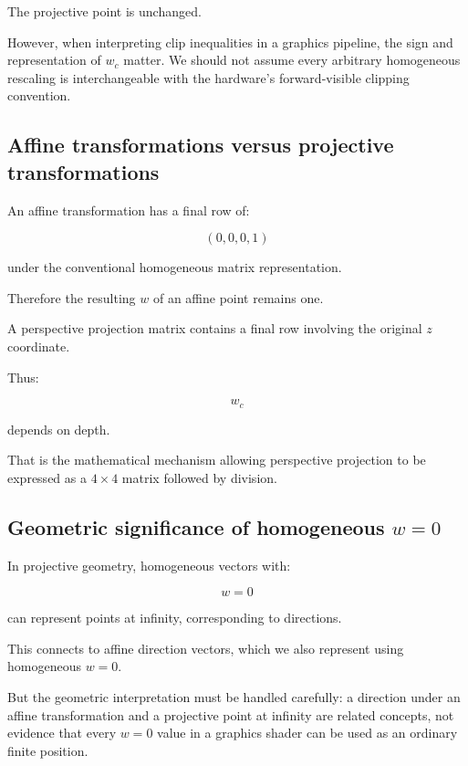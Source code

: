 The projective point is unchanged.

However, when interpreting clip inequalities in a graphics pipeline, the sign and representation of \(w_c\) matter. We should not assume every arbitrary homogeneous rescaling is interchangeable with the hardware's forward-visible clipping convention.

\subsection{Affine transformations versus projective transformations}\label{02-foundations-ii-ch033-affine-transformations-versus-projective-transformations}

\hypertarget{02-foundations-ii-ch033-affine-transformations-versus-projective-transformations}{}

An affine transformation has a final row of:

\[
 (0,0,0,1)
\]

under the conventional homogeneous matrix representation.

Therefore the resulting \(w\) of an affine point remains one.

A perspective projection matrix contains a final row involving the original \(z\) coordinate.

Thus:

\[
 w_c
\]

depends on depth.

That is the mathematical mechanism allowing perspective projection to be expressed as a \(4\times4\) matrix followed by division.

\subsection{\texorpdfstring{Geometric significance of homogeneous \(w=0\)}{Geometric significance of homogeneous w=0}}\label{02-foundations-ii-ch033-geometric-significance-of-homogeneous-w0}

\hypertarget{02-foundations-ii-ch033-geometric-significance-of-homogeneous-w0}{}

In projective geometry, homogeneous vectors with:

\[
 w=0
\]

can represent points at infinity, corresponding to directions.

This connects to affine direction vectors, which we also represent using homogeneous \(w=0\).

But the geometric interpretation must be handled carefully: a direction under an affine transformation and a projective point at infinity are related concepts, not evidence that every \(w=0\) value in a graphics shader can be used as an ordinary finite position.

